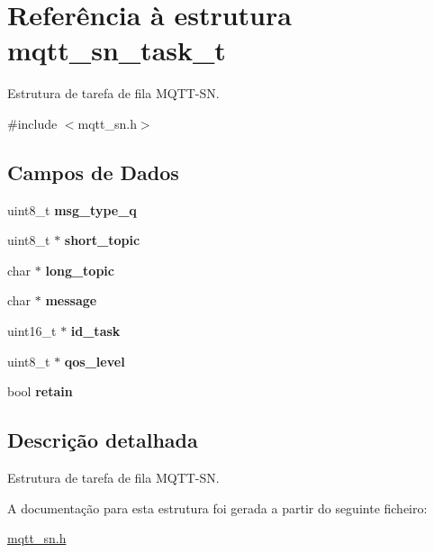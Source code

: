 \hypertarget{structmqtt__sn__task__t}{\section{Referência à estrutura mqtt\+\_\+sn\+\_\+task\+\_\+t}
\label{structmqtt__sn__task__t}
}


Estrutura de tarefa de fila M\+Q\+T\+T-\/\+S\+N.  




{\ttfamily \#include $<$mqtt\+\_\+sn.\+h$>$}

\subsection*{Campos de Dados}
\begin{DoxyCompactItemize}
\item 
\hypertarget{structmqtt__sn__task__t_a6b9a925f3adb717097ee92e90a19a5c8}{uint8\+\_\+t {\bfseries msg\+\_\+type\+\_\+q}}\label{structmqtt__sn__task__t_a6b9a925f3adb717097ee92e90a19a5c8}

\item 
\hypertarget{structmqtt__sn__task__t_ac4e84d03d55334d29e5f975d1a9b7fdf}{uint8\+\_\+t $\ast$ {\bfseries short\+\_\+topic}}\label{structmqtt__sn__task__t_ac4e84d03d55334d29e5f975d1a9b7fdf}

\item 
\hypertarget{structmqtt__sn__task__t_a386cd08f6346e174279a8ca2f17c61c8}{char $\ast$ {\bfseries long\+\_\+topic}}\label{structmqtt__sn__task__t_a386cd08f6346e174279a8ca2f17c61c8}

\item 
\hypertarget{structmqtt__sn__task__t_a0b2e8c7f76df48129f994ecc46d5c66c}{char $\ast$ {\bfseries message}}\label{structmqtt__sn__task__t_a0b2e8c7f76df48129f994ecc46d5c66c}

\item 
\hypertarget{structmqtt__sn__task__t_a54d7109effe58a5b737e72545afada82}{uint16\+\_\+t $\ast$ {\bfseries id\+\_\+task}}\label{structmqtt__sn__task__t_a54d7109effe58a5b737e72545afada82}

\item 
\hypertarget{structmqtt__sn__task__t_a83d9c097f952573da388bb6bdc6696a0}{uint8\+\_\+t $\ast$ {\bfseries qos\+\_\+level}}\label{structmqtt__sn__task__t_a83d9c097f952573da388bb6bdc6696a0}

\item 
\hypertarget{structmqtt__sn__task__t_a5676a68f94f845f010b0bd5ff519517b}{bool {\bfseries retain}}\label{structmqtt__sn__task__t_a5676a68f94f845f010b0bd5ff519517b}

\end{DoxyCompactItemize}


\subsection{Descrição detalhada}
Estrutura de tarefa de fila M\+Q\+T\+T-\/\+S\+N. 

A documentação para esta estrutura foi gerada a partir do seguinte ficheiro\+:\begin{DoxyCompactItemize}
\item 
\hyperlink{mqtt__sn_8h}{mqtt\+\_\+sn.\+h}\end{DoxyCompactItemize}
